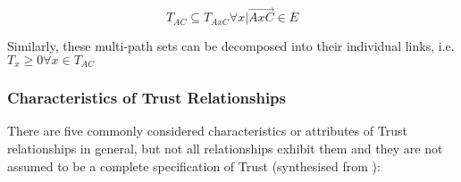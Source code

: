 \begin{equation}
	T_{AC} \subseteq T_{AxC} \forall x | \overrightarrow{AxC} \in E
\end{equation}

Similarly, these multi-path sets can be decomposed into their individual links, i.e. $T_x \ge 0 \forall x \in T_{AC}$
\subsubsection{Characteristics of Trust Relationships}

There are five commonly considered characteristics or attributes of Trust relationships in general, but not all relationships exhibit them and they are not assumed to be a complete specification of Trust (synthesised from \cite{Liu2006,Mayer1995, Mcknight1996, Pavan2015}):


